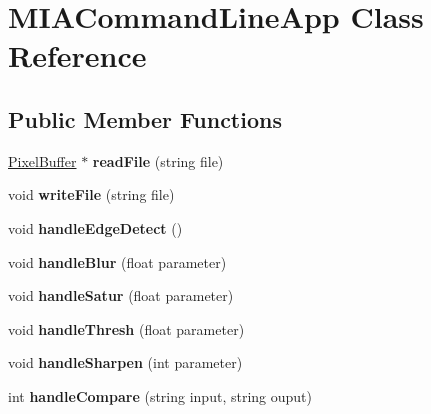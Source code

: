 \hypertarget{classMIACommandLineApp}{\section{M\-I\-A\-Command\-Line\-App Class Reference}
\label{classMIACommandLineApp}
}
\subsection*{Public Member Functions}
\begin{DoxyCompactItemize}
\item 
\hypertarget{classMIACommandLineApp_a769f7b7b3f3684686afb424c00db4ee4}{\hyperlink{classPixelBuffer}{Pixel\-Buffer} $\ast$ {\bfseries read\-File} (string file)}\label{classMIACommandLineApp_a769f7b7b3f3684686afb424c00db4ee4}

\item 
\hypertarget{classMIACommandLineApp_a5c98945cdad816e6645dc09f1537fc9e}{void {\bfseries write\-File} (string file)}\label{classMIACommandLineApp_a5c98945cdad816e6645dc09f1537fc9e}

\item 
\hypertarget{classMIACommandLineApp_ad7e4e22804b01321b8366627297d3915}{void {\bfseries handle\-Edge\-Detect} ()}\label{classMIACommandLineApp_ad7e4e22804b01321b8366627297d3915}

\item 
\hypertarget{classMIACommandLineApp_a9be162f864792a003931a33d24e1fa52}{void {\bfseries handle\-Blur} (float parameter)}\label{classMIACommandLineApp_a9be162f864792a003931a33d24e1fa52}

\item 
\hypertarget{classMIACommandLineApp_a3a3cd95334889d1c5ae8f0871080bd18}{void {\bfseries handle\-Satur} (float parameter)}\label{classMIACommandLineApp_a3a3cd95334889d1c5ae8f0871080bd18}

\item 
\hypertarget{classMIACommandLineApp_a80568f718b9ed0d0b520cc5f1fb72ca0}{void {\bfseries handle\-Thresh} (float parameter)}\label{classMIACommandLineApp_a80568f718b9ed0d0b520cc5f1fb72ca0}

\item 
\hypertarget{classMIACommandLineApp_ae231f6b1b186a3f4ae7d168175e7fac4}{void {\bfseries handle\-Sharpen} (int parameter)}\label{classMIACommandLineApp_ae231f6b1b186a3f4ae7d168175e7fac4}

\item 
\hypertarget{classMIACommandLineApp_afc01f09633833fa92beedb52f2098ca7}{int {\bfseries handle\-Compare} (string input, string ouput)}\label{classMIACommandLineApp_afc01f09633833fa92beedb52f2098ca7}


\end{DoxyCompactItemize}
